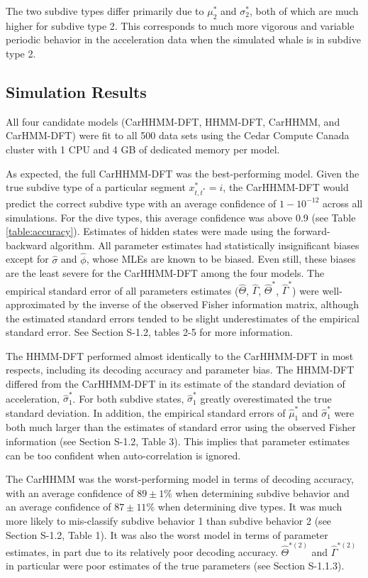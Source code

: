 The two subdive types differ primarily due to $\mu_2^*$ and $\sigma_2^*$, both of which are much higher for subdive type 2. This corresponds to much more vigorous and variable periodic behavior in the acceleration data when the simulated whale is in subdive type 2.

\subsection{Simulation Results}

All four candidate models (CarHHMM-DFT, HHMM-DFT, CarHHMM, and CarHMM-DFT) were fit to all 500 data sets using the Cedar Compute Canada cluster with 1 CPU and 4 GB of dedicated memory per model.

As expected, the full CarHHMM-DFT was the best-performing model. Given the true subdive type of a particular segment $x^*_{t,t^*} = i$, the CarHHMM-DFT would predict the correct subdive type with an average confidence of $1 - 10^{-12}$ across all simulations. For the dive types, this average confidence was above 0.9 (see Table \ref{table:accuracy}). Estimates of hidden states were made using the forward-backward algorithm. All parameter estimates had statistically insignificant biases except for $\hat \sigma$ and $\hat \phi$, whose MLEs are known to be biased. Even still, these biases are the least severe for the CarHHMM-DFT among the four models. The empirical standard error of all parameters estimates ($\hat \Theta$, $\hat \Gamma$, $\hat \Theta^*$, $\hat \Gamma^*$) were well-approximated by the inverse of the observed Fisher information matrix, although the estimated standard errors tended to be slight underestimates of the empirical standard error. See Section S-1.2, tables 2-5 for more information.

The HHMM-DFT performed almost identically to the CarHHMM-DFT in most respects, including its decoding accuracy and parameter bias. The HHMM-DFT differed from the CarHHMM-DFT in its estimate of the standard deviation of acceleration, $\hat \sigma_1^*$. For both subdive states, $\hat \sigma_1^*$ greatly overestimated the true standard deviation. In addition, the empirical standard errors of $\hat \mu_1^*$ and $\hat \sigma_1^*$ were both much larger than the estimates of standard error using the observed Fisher information (see Section S-1.2, Table 3). This implies that parameter estimates can be too confident when auto-correlation is ignored.

The CarHHMM was the worst-performing model in terms of decoding accuracy, with an average confidence of $89 \pm 1\%$ when determining subdive behavior and an average confidence of $87 \pm 11\%$ when determining dive types. It was much more likely to mis-classify subdive behavior 1 than subdive behavior 2 (see Section S-1.2, Table 1). It was also the worst model in terms of parameter estimates, in part due to its relatively poor decoding accuracy. $\hat \Theta^{*(2)}$ and $\hat \Gamma^{*(2)}$ in particular were poor estimates of the true parameters (see Section S-1.1.3).

